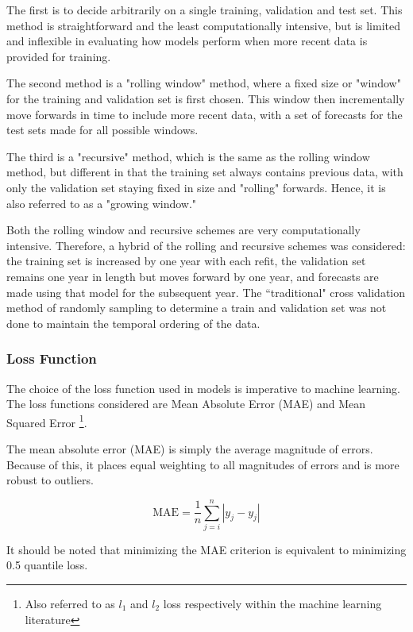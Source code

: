 \documentclass[11pt, a4paper, table]{article}
\begin{document}
The first is to decide arbitrarily on a single training, validation and test set. This method is straightforward and the least computationally intensive, but is limited and inflexible in evaluating how models perform when more recent data is provided for training. 

The second method is a "rolling window" method, where a fixed size or "window" for the training and validation set is first chosen. This window then incrementally move forwards in time to include more recent data, with a set of forecasts for the test sets made for all possible windows.

The third is a "recursive" method, which is the same as the rolling window method, but different in that the training set always contains previous data, with only the validation set staying fixed in size and "rolling" forwards. Hence, it is also referred to as a "growing window."

Both the rolling window and recursive schemes are very computationally intensive. Therefore, a hybrid of the rolling and recursive schemes was considered: the training set is increased by one year with each refit, the validation set remains one year in length but moves forward by one year, and forecasts are made using that model for the subsequent year. The ``traditional" cross validation method of randomly sampling to determine a train and validation set was not done to maintain the temporal ordering of the data.

\subsubsection{Loss Function}
\label{loss_function}
The choice of the loss function used in models is imperative to machine learning. The loss functions considered are Mean Absolute Error (MAE) and Mean Squared Error \footnote{Also referred to as $l_1$ and $l_2$ loss respectively within the machine learning literature}.

The mean absolute error (MAE) is simply the average magnitude of errors. Because of this, it places equal weighting to all magnitudes of errors and is more robust to outliers. 

\begin{equation}
	\text{MAE} = \frac{1}{n} \sum_{j = i}^{n} |y_j - \hat{y_j}|
\end{equation}

It should be noted that minimizing the MAE criterion is equivalent to minimizing 0.5 quantile loss.
\end{document}
